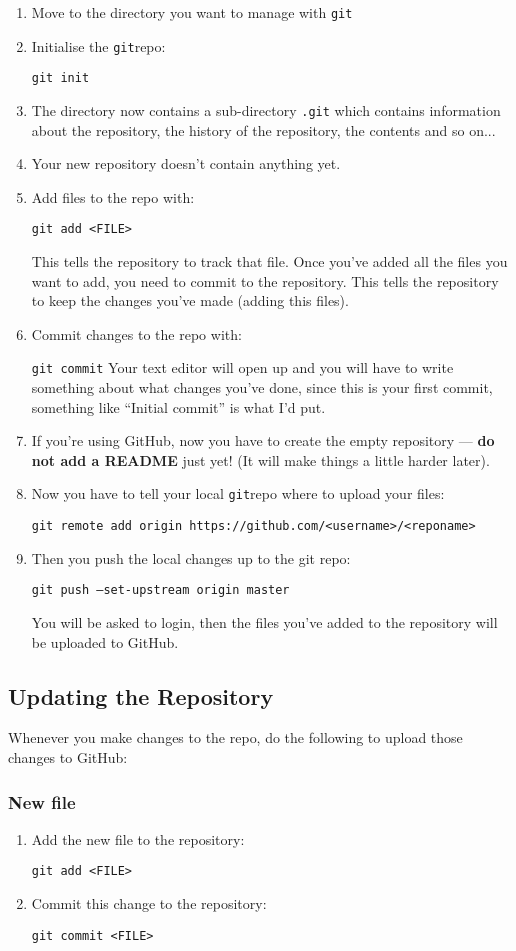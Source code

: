 \documentclass{article}
\newcommand\git{\texttt{git}}
\begin{document}
\begin{enumerate}
	\item Move to the directory you want to manage with \git
	\item Initialise the \git repo:
	
	\texttt{git init}
	
	\item The directory now contains a sub-directory \texttt{.git} which contains information about the repository, the history of the repository, the contents and so on...
	\item Your new repository doesn't contain anything yet.
	\item Add files to the repo with:
	
	\texttt{git add <FILE>}
	
	This tells the repository to track that file. Once you've added all the files you want to add, you need to commit to the repository. This tells the repository to keep the changes you've made (adding this files).
	\item Commit changes to the repo with:
	
	\texttt{git commit}
	Your text editor will open up and you will have to write something about what changes you've done, since this is your first commit, something like ``Initial commit'' is what I'd put.
	\item If you're using GitHub, now you have to create the empty repository --- \textbf{do not add a README} just yet! (It will make things a little harder later).
	\item Now you have to tell your local \git repo where to upload your files:
	
	\texttt{git remote add origin https://github.com/<username>/<reponame>}
	\item Then you push the local changes up to the git repo:
	
	\texttt{git push --set-upstream origin master}
	
	You will be asked to login, then the files you've added to the repository will be uploaded to GitHub.
\end{enumerate}
  
\subsection*{Updating the Repository}
Whenever you make changes to the repo, do the following to upload those changes to GitHub:

\subsubsection*{New file}
\begin{enumerate}
	\item Add the new file to the repository:
	
	\texttt{git add <FILE>}
		
	\item Commit this change to the repository:
	
	\texttt{git commit <FILE>}
\end{enumerate}
\end{document}
